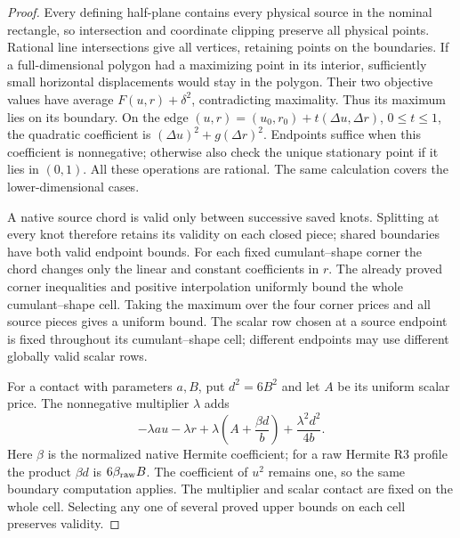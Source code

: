 \documentclass{article}
\begin{document}
\begin{proof}
Every defining half-plane contains every physical source in the nominal
rectangle, so intersection and coordinate clipping preserve all physical
points. Rational line intersections give all vertices, retaining points
on the boundaries. If a full-dimensional polygon had a maximizing point
in its interior, sufficiently small horizontal displacements would stay
in the polygon. Their two objective values have average
$F(u,r)+\delta^2$, contradicting maximality. Thus its maximum lies on its
boundary. On the edge $(u,r)=(u_0,r_0)+t(\Delta u,\Delta r)$,
$0\le t\le1$, the quadratic coefficient is
$(\Delta u)^2+g(\Delta r)^2$. Endpoints suffice when this coefficient is
nonnegative; otherwise also check the unique stationary point if it lies
in $(0,1)$. All these operations are rational. The same calculation covers
the lower-dimensional cases.

A native source chord is valid only between successive saved knots.
Splitting at every knot therefore retains its validity on each closed
piece; shared boundaries have both valid endpoint bounds. For each fixed
cumulant--shape corner the chord changes only the linear and constant
coefficients in $r$. The already proved corner inequalities and positive
interpolation uniformly bound the whole cumulant--shape cell. Taking the
maximum over the four corner prices and all source pieces gives a uniform
bound. The scalar row chosen at a source endpoint is fixed throughout its
cumulant--shape cell; different endpoints may use different globally
valid scalar rows.

For a contact with parameters $a,B$, put $d^2=6B^2$ and let $A$ be its
uniform scalar price. The nonnegative multiplier $\lambda$ adds
\[
 -\lambda a u-\lambda r+
 \lambda\left(A+\frac{\beta d}{b}\right)
 +\frac{\lambda^2d^2}{4b}.
\]
Here $\beta$ is the normalized native Hermite coefficient; for a raw
Hermite R3 profile the product $\beta d$ is $6\beta_{\rm raw}B$.
The coefficient of $u^2$ remains one, so the same boundary computation
applies. The multiplier and scalar contact are fixed on the whole
cell. Selecting any one of several proved upper bounds on each cell
preserves validity.
\end{proof}
\end{document}
